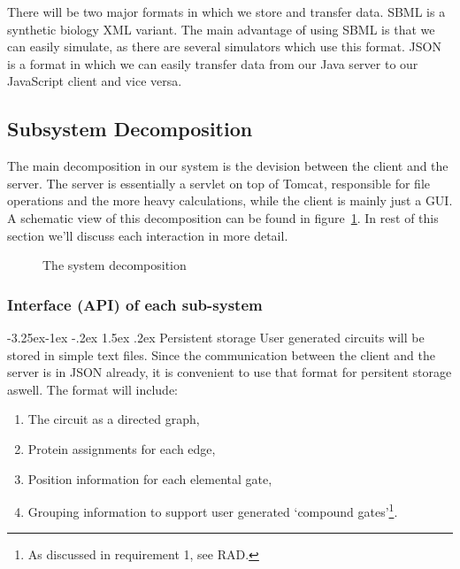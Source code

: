 \documentclass[a4paper]{article}
\makeatletter
\renewcommand\paragraph{\@startsection{paragraph}{4}{\z@}%
  {-3.25ex\@plus -1ex \@minus -.2ex}%
  {1.5ex \@plus .2ex}%
  {\normalfont\normalsize\bfseries}}
\makeatother
\begin{document}
There will be two major formats in which we store and transfer data. SBML is a synthetic biology XML variant. The main advantage of using SBML is that we can easily simulate, as there are several simulators which use this format. JSON is a format in which we can easily transfer data from our Java server to our JavaScript client and vice versa. 

\subsection{Subsystem Decomposition}
The main decomposition in our system is the devision between the client and the server. The server is essentially a servlet on top of Tomcat, responsible for file operations and the more heavy calculations, while the client is mainly just a GUI. A schematic view of this decomposition can be found in figure~\ref{fig-decomposition}. In rest of this section we'll discuss each interaction in more detail.

\begin{figure}[h!]
        \caption{The system decomposition}
        \label{fig-decomposition}
        \centering
\end{figure}

\pagebreak

\subsubsection{Interface (API) of each sub-system}

\paragraph{Persistent storage}
User generated circuits will be stored in simple text files. Since the communication between the client and the server is in JSON already, it is convenient to use that format for persitent storage aswell. The format will include:
\begin{enumerate}[-]
        \item The circuit as a directed graph,
        \item Protein assignments for each edge,
        \item Position information for each elemental gate,
        \item Grouping information to support user generated `compound gates'\footnote{As discussed in requirement 1, see RAD.}.
\end{enumerate}
\end{document}
